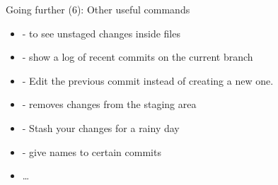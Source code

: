 \begin{frame}{Going further (6): Other useful commands}
  \begin{itemize}
    \item {} - to see unstaged changes inside files
    \item {} - show a log of recent commits on the current branch
    \item {} - Edit the previous commit instead of creating a new one. 
    \item {} - removes changes from the staging area
    \item {} - Stash your changes for a rainy day
    \item {} - give names to certain commits
    \item \dots
  \end{itemize}
\end{frame}